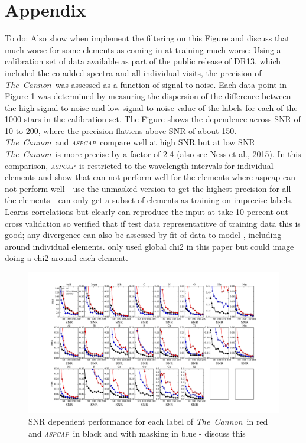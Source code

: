 \documentclass[14pt, preprint2]{aastex6}
\newcommand{\project}[1]{\textsl{#1}}
\newcommand{\tc}{\project{The~Cannon}}
\newcommand{\aspcap}{\project{\textsc{aspcap}}}
\begin{document}
\section{Appendix}
To do: Also show when implement the filtering on this Figure and discuss that much worse for some elements as coming in at training much worse:
Using a calibration set of data available as part of the public release of DR13, which included the co-added spectra and all individual visits, the precision of \tc\ was assessed as a function of signal to noise. Each data point in Figure \ref{fig:snr_error} was determined by measuring the dispersion of the difference between the high signal to noise and low signal to noise value of the labels for each of the 1000 stars in the calibration set. The Figure shows the dependence across SNR of 10 to 200, where the precision flattens above SNR of about 150. \tc\ and \aspcap\ compare well at high SNR but at low SNR \tc\ is more precise by a factor of 2-4 (also see Ness et al., 2015). In this comparison, \aspcap\ is restricted to the wavelength intervals for individual elements and show that can not perform well for the elements where aspcap can not perform well - use the unmasked version to get the highest precision for all the elements - can only get a subset of elements as training on imprecise labels. Learns correlations but clearly can reproduce the input at take 10 percent out cross validation so verified that if test data representatitve of training data this is good; any divergence can also be assessed by fit of data to model , including around individual elements. only used global chi2 in this paper but could image doing a chi2 around each element. 


\begin{figure}[h!]
\includegraphics[scale=0.45]{rms_snr_both_dr132.pdf} 
  \caption{SNR dependent performance for each label of \tc\ in red and \aspcap\ in black and with masking in blue - discuss this}
\label{fig:snr_error}
\end{figure}


\end{document}
